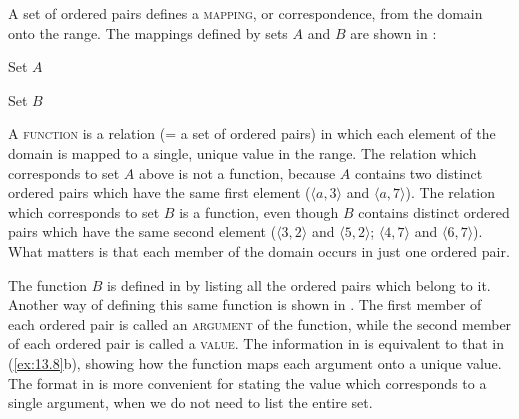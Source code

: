 A set of ordered pairs defines a \textsc{mapping}, or correspondence, from the domain onto the range. The mappings defined by sets $A$ and $B$ are shown in :

\ea \label{ex:13.8}
\ea Set $A$\\
\ex  Set $B$\\

\z \z


A \textsc{function} is a relation (= a set of ordered pairs) in which each element of the domain is mapped to a single, unique value in the range. The relation which corresponds to set $A$ above is not a function, because $A$ contains two distinct ordered pairs which have the same first element ($\langle a,3\rangle$ and $\langle a,7\rangle$). The relation which corresponds to set $B$ is a function, even though $B$ contains distinct ordered pairs which have the same second element ($\langle 3,2\rangle$ and $\langle 5,2\rangle$; $\langle 4,7\rangle$ and $\langle 6,7\rangle$). What matters is that each member of the domain occurs in just one ordered pair.



The function $B$ is defined in  by listing all the ordered pairs which belong to it. Another way of defining this same function is shown in . The first member of each ordered pair is called an \textsc{argument} of the function, while the second member of each ordered pair is called a \textsc{value}. The information in  is equivalent to that in (\ref{ex:13.8}b), showing how the function maps each argument onto a unique value. The format in  is more convenient for stating the value which corresponds to a single argument, when we do not need to list the entire set.


